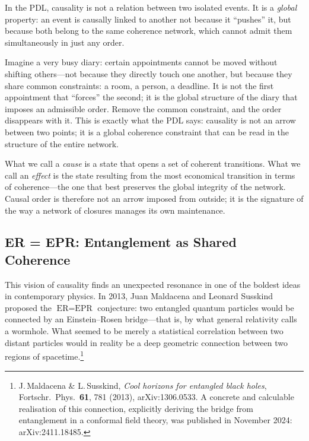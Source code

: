 \documentclass[12pt, a4paper, openright]{book}
\begin{document}
In the PDL, causality is not a relation between two isolated events. It is a \emph{global} property: an event is causally linked to another not because it ``pushes'' it, but because both belong to the same coherence network, which cannot admit them simultaneously in just any order.

\medskip

Imagine a very busy diary: certain appointments cannot be moved without shifting others---not because they directly touch one another, but because they share common constraints: a room, a person, a deadline. It is not the first appointment that ``forces'' the second; it is the global structure of the diary that imposes an admissible order. Remove the common constraint, and the order disappears with it. This is exactly what the PDL says: causality is not an arrow between two points; it is a global coherence constraint that can be read in the structure of the entire network.

\medskip

What we call a \emph{cause} is a state that opens a set of coherent transitions. What we call an \emph{effect} is the state resulting from the most economical transition in terms of coherence---the one that best preserves the global integrity of the network. Causal order is therefore not an arrow imposed from outside; it is the signature of the way a network of closures manages its own maintenance.

\subsection*{ER = EPR: Entanglement as Shared Coherence}

This vision of causality finds an unexpected resonance in one of the boldest ideas in contemporary physics. In 2013, Juan Maldacena and Leonard Susskind proposed the $\text{ER} = \text{EPR}$ conjecture: two entangled quantum particles would be connected by an Einstein--Rosen bridge---that is, by what general relativity calls a wormhole. What seemed to be merely a statistical correlation between two distant particles would in reality be a deep geometric connection between two regions of spacetime.\footnote{J.\,Maldacena \& L.\,Susskind, \textit{Cool horizons for entangled black holes}, Fortschr.\ Phys.\ \textbf{61}, 781 (2013), arXiv:1306.0533. A concrete and calculable realisation of this connection, explicitly deriving the bridge from entanglement in a conformal field theory, was published in November 2024: arXiv:2411.18485.}
\end{document}
